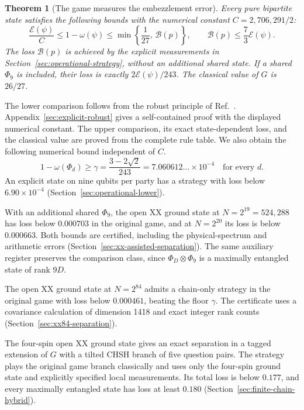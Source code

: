 \documentclass[10pt,a4paper]{article}
\newtheorem{theorem}{Theorem}
\theoremstyle{remark}
\newcommand{\cE}{\mathcal{E}}
\begin{document}
\begin{theorem}[The game measures the embezzlement error]\label{thm:equiv}
Every pure bipartite state satisfies the following bounds with the numerical
constant $C=2{,}706{,}291/2$:
\[
\frac{\cE(\psi)}{C}\le1-\omega(\psi)
\le\min\left\{\frac1{27},\,\mathcal B(p)\right\},
\qquad \mathcal B(p)\le\frac73\cE(\psi).
\]
The loss $\mathcal B(p)$ is achieved by the explicit measurements in
Section~\ref{sec:operational-strategy}, without an additional shared state.
If a shared $\Phi_9$ is included, their loss is exactly
$2\cE(\psi)/243$. The classical value of $G$ is $26/27$.
\end{theorem}

The lower comparison follows from the robust principle of Ref.~\cite{TG}.
Appendix~\ref{sec:explicit-robust} gives a self-contained proof with the
displayed numerical constant. The upper comparison, its exact state-dependent
loss, and the classical value are proved from the complete rule table.
We also obtain the following numerical bound independent of $C$.
\begin{equation}\label{eq:gamma-intro}
1-\omega(\Phi_d)\ge
\gamma=\frac{3-2\sqrt2}{243}
=7.060612\ldots\times10^{-4}
\quad\text{for every }d.
\end{equation}
An explicit state on nine qubits per party has a strategy with loss below
$6.90\times10^{-4}$ (Section~\ref{sec:operational-lower}).

With an additional shared $\Phi_9$, the open XX ground state at
$N=2^{19}=524{,}288$ has loss below $0.000703$ in the original game,
and at $N=2^{20}$ its loss is below $0.000663$.
Both bounds are certified, including the physical-spectrum and arithmetic
errors (Section~\ref{sec:xx-assisted-separation}). The same auxiliary
register preserves the comparison class, since
$\Phi_D\otimes\Phi_9$ is a maximally entangled state of rank $9D$.

The open XX ground state at $N=2^{84}$ admits a chain-only strategy in the
original game with loss below $0.000461$, beating the floor $\gamma$.
The certificate uses a covariance calculation of dimension 1418 and exact
integer rank counts (Section~\ref{sec:xx84-separation}).

The four-spin open XX ground state gives an exact separation in a tagged
extension of $G$ with a tilted CHSH branch of five question pairs. The
strategy plays the original game branch classically and uses only the
four-spin ground state and explicitly specified local measurements. Its
total loss is below $0.177$, and every maximally entangled state has loss
at least $0.180$ (Section~\ref{sec:finite-chain-hybrid}).
\end{document}
